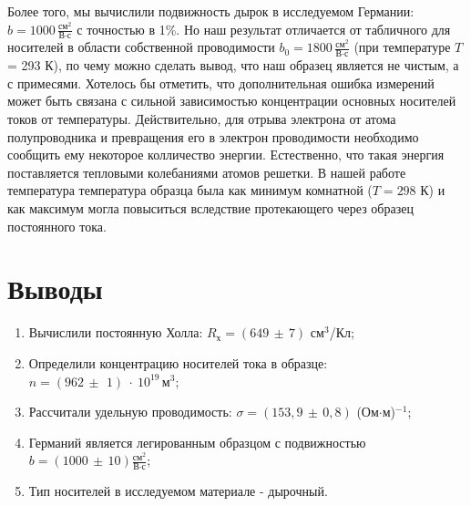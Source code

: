 \documentclass[a4paper,12pt]{article} %
\begin{document}
	Более того, мы вычислили подвижность дырок в исследуемом Германии: $b = 1000\, \frac{\text{см}^2}{\text{В}\cdot\text{с}}$ с точностью в 1\%. Но наш результат отличается от табличного для носителей в области собственной проводимости $b_0 = 1800\, \frac{\text{см}^2}{\text{В}\cdot\text{с}}$ (при температуре $T$ = 293 К), по чему можно сделать вывод, что наш образец является не чистым, а с примесями. Хотелось бы отметить, что дополнительная ошибка измерений может быть связана с сильной зависимостью концентрации основных носителей токов от температуры. Действительно, для отрыва электрона от атома полупроводника и превращения его в электрон проводимости необходимо сообщить ему некоторое колличество энергии. Естественно, что такая энергия поставляется тепловыми колебаниями атомов решетки. В нашей работе температура температура образца была как минимум комнатной ($T = 298$ К) и как максимум могла повыситься вследствие протекающего через образец постоянного тока.
	
	
\section{Выводы}
	\begin{enumerate}
		\item 
			Вычислили постоянную Холла: $R_\text{х} = (649\,\pm\,7)$ см$^3$/Кл;
		\item 
			Определили концентрацию носителей тока в образце: $n = (962\,\pm~\,1)~\cdot~10^{19}\,\text{м}^3$;
		\item
			Рассчитали удельную проводимость: $\sigma = (153,9\,\pm\, 0,8)$ (Ом$\cdot$м)$^{-1}$;
		\item 	
			Германий является легированным образцом с подвижностью $b = (1000\,\pm\, 10) \frac{\text{см}^2}{\text{В}\cdot\text{с}}$;
		\item
			Тип носителей в исследуемом материале - дырочный.
	\end{enumerate}
\end{document}
